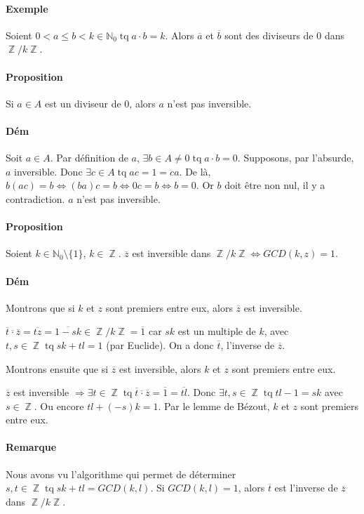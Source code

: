 \documentclass{article}
\DeclareMathOperator{\tq}{\text{ tq }}
\DeclareMathOperator{\Z}{\mathbb Z}
\begin{document}
			\paragraph{Exemple} Soient $0 < a \leq b < k \in \mathbb N_0 \tq a \cdot b = k$. Alors $\overline a$ et $\overline b$ sont des diviseurs
			de 0 dans $\Z/k\Z$.

			\paragraph{Proposition} Si $a \in A$ est un diviseur de 0, alors $a$ n'est pas inversible.

			\paragraph{Dém} Soit $a \in A$. Par définition de $a$, $\exists b \in A \neq 0 \tq a \cdot b = 0$.
			Supposons, par l'absurde, $a$ inversible. Donc $\exists c \in A \tq ac = 1 = ca$. De là, $b(ac) = b \iff (ba)c = b \iff 0c = b \iff b = 0$.
			Or $b$ doit être non nul, il y a contradiction. $a$ n'est pas inversible.

			\paragraph{Proposition} Soient $k \in \mathbb N_0 \setminus \{1\}$, $k \in \Z$. $\overline z$ est inversible dans $\Z/k\Z \iff GCD(k, z) = 1$.

			\paragraph{Dém} Montrons que si $k$ et $z$ sont premiers entre eux, alors $\overline z$ est inversible.

			$\overline{t} \overline{\cdot} \overline{z} = \overline{tz} = \overline{1-sk} \in\Z / k\Z = \overline 1$ car $sk$ est un multiple de $k$, avec $t, s \in \Z \tq
			sk + tl = 1$ (par Euclide). On a donc $\overline t$, l'inverse de $\overline z$.

			Montrons ensuite que si $\overline z$ est inversible, alors $k$ et $z$ sont premiers entre eux.

			$\overline z$ est inversible $\Rightarrow \exists t \in \Z \tq \overline t \overline \cdot \overline z = \overline 1 = \overline{tl}$. Donc $\exists t, s \in \Z
			\tq tl - 1 = sk$ avec $s \in \Z$. Ou encore $tl + (-s)k = 1$. Par le lemme de Bézout, $k$ et $z$ sont premiers entre eux.

			\paragraph{Remarque} Nous avons vu l'algorithme qui permet de déterminer $s, t \in\Z \tq sk + tl = GCD(k, l)$. Si $GCD(k, l) = 1$, alors $\overline t$ est
			l'inverse de $\overline z$ dans $\Z / k\Z$.
\end{document}
